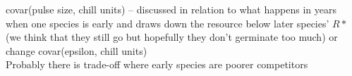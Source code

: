 \documentclass[11pt,letter]{article}
\begin{document}
covar(pulse size, chill units) -- discussed in relation to what happens in years when one species is early and draws down the resource below later species' $R*$ (we think that they still go but hopefully they don't germinate too much) or change covar(epsilon, chill units)\\

Probably there is trade-off where early species are poorer competitors
\end{document}
